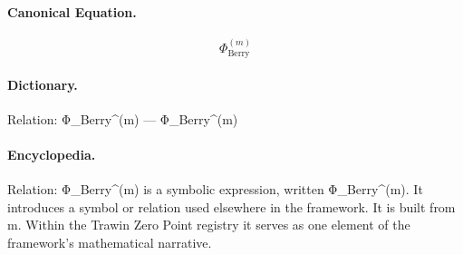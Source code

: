 \paragraph{Canonical Equation.}
\[
\Phi_{\text{Berry}}^{(m)}
\]

\paragraph{Dictionary.}
Relation: Φ\_Berry\textasciicircum{}(m) — Φ\_Berry\textasciicircum{}(m)

\paragraph{Encyclopedia.}
Relation: Φ\_Berry\textasciicircum{}(m) is a symbolic expression, written Φ\_Berry\textasciicircum{}(m). It introduces a symbol or relation used elsewhere in the framework. It is built from m. Within the Trawin Zero Point registry it serves as one element of the framework's mathematical narrative.
